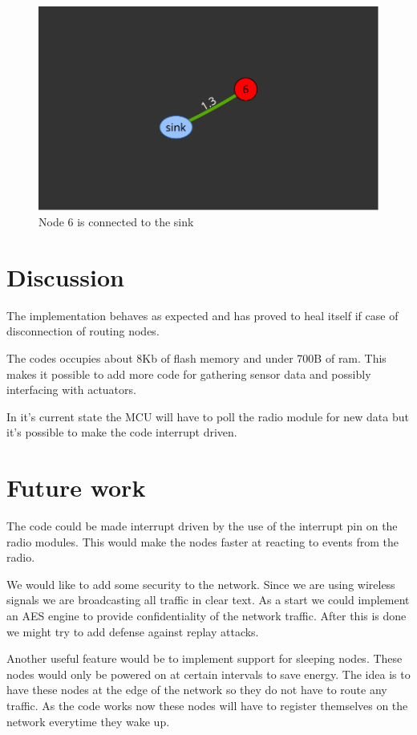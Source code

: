 \documentclass[a4paper,11pt]{article}
\begin{document}
\begin{figure}[H]
  \centering
  \includegraphics[width=.7\textwidth]{map.pdf}
  \caption{Node 6 is connected to the sink}
  \label{fig:web}
\end{figure}

\section{Discussion}
The implementation behaves as expected and has proved to heal itself
if case of disconnection of routing nodes.

The codes occupies about 8Kb of flash memory and under 700B of ram.
This makes it possible to add more code for gathering sensor data and
possibly interfacing with actuators.

In it's current state the MCU will have to poll the radio module for
new data but it's possible to make the code interrupt driven.

\section{Future work}
The code could be made interrupt driven by the use of the interrupt
pin on the radio modules. This would make the nodes faster at reacting
to events from the radio.

We would like to add some security to the network. Since we are using
wireless signals we are broadcasting all traffic in clear text. As a
start we could implement an AES engine to provide confidentiality of
the network traffic. After this is done we might try to add defense
against replay attacks.

Another useful feature would be to implement support for sleeping
nodes. These nodes would only be powered on at certain intervals to
save energy. The idea is to have these nodes at the edge of the
network so they do not have to route any traffic. As the code works
now these nodes will have to register themselves on the network
everytime they wake up.
\end{document}
